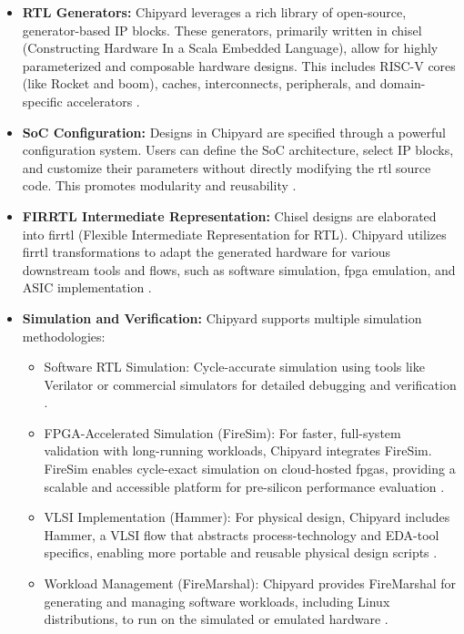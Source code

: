 \begin{itemize}
    \item \textbf{RTL Generators:} Chipyard leverages a rich library of open-source, generator-based IP blocks. These generators, primarily written in \gls{chisel} (Constructing Hardware In a Scala Embedded Language), allow for highly parameterized and composable hardware designs. This includes RISC-V cores (like Rocket and \gls{boom}), caches, interconnects, peripherals, and domain-specific accelerators \cite{chipyard}.

    \item \textbf{SoC Configuration:} Designs in Chipyard are specified through a powerful configuration system. Users can define the SoC architecture, select IP blocks, and customize their parameters without directly modifying the \gls{rtl} source code. This promotes modularity and reusability \cite[p.~27]{chipyard}.

    \item \textbf{FIRRTL Intermediate Representation:} Chisel designs are elaborated into \gls{firrtl} (Flexible Intermediate Representation for RTL). Chipyard utilizes \gls{firrtl} transformations to adapt the generated hardware for various downstream tools and flows, such as software simulation, \gls{fpga} emulation, and ASIC implementation \cite{chipyard}.

    \item \textbf{Simulation and Verification:} Chipyard supports multiple simulation methodologies:

    \begin{itemize}
        \item Software RTL Simulation: Cycle-accurate simulation using tools like Verilator or commercial simulators for detailed debugging and verification \cite[p.~29]{chipyard}.

        \item FPGA-Accelerated Simulation (FireSim): For faster, full-system validation with long-running workloads, Chipyard integrates FireSim. FireSim enables cycle-exact simulation on cloud-hosted \glspl{fpga}, providing a scalable and accessible platform for pre-silicon performance evaluation \cite{karandikar2018firesim, chipyard}. 

        \item VLSI Implementation (Hammer): For physical design, Chipyard includes Hammer, a VLSI flow that abstracts process-technology and EDA-tool specifics, enabling more portable and reusable physical design scripts \cite{chipyard}.

        \item Workload Management (FireMarshal): Chipyard provides FireMarshal for generating and managing software workloads, including Linux distributions, to run on the simulated or emulated hardware \cite{chipyard}.
    \end{itemize}
\end{itemize}

